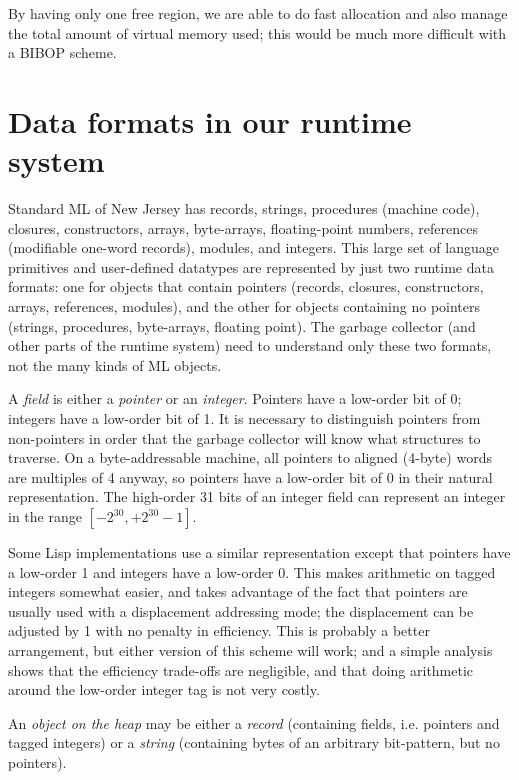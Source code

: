 By having only one free region, we are
able to do fast allocation
and also manage the total amount of virtual
memory used\cite{appel89:sggc}; this would be much more difficult
with a BIBOP scheme.

\section{Data formats in our runtime system}
\label{data}
Standard ML of New Jersey has
records, strings, procedures (machine code),
closures, constructors, arrays, byte-arrays, floating-point
numbers, references (modifiable one-word records),
modules, and integers.  This large set of language primitives and
user-defined datatypes are represented
by just two runtime data formats: one for objects that contain pointers
(records, closures, constructors, arrays, references, modules), and
the other for objects containing no pointers (strings, procedures,
byte-arrays, floating point).  The garbage collector (and other
parts of the runtime system) need to understand only these two formats,
not the many kinds of ML objects.

A {\em field} is either a 
{\em pointer} or an {\em integer}.  Pointers
have a low-order bit of 0; integers have a low-order bit of 1.
It is necessary to distinguish pointers from non-pointers in order that
the garbage collector
will know what structures to traverse.
On a byte-addressable machine, all pointers to aligned (4-byte) words
are multiples of 4 anyway, so pointers have a low-order bit of 0 in
their natural representation.  The high-order 31 bits of an integer
field can represent an integer in the range $[-2^{30}, +2^{30}-1]$.

Some Lisp implementations use a similar representation except that
pointers have a low-order 1 and integers have a low-order 0. This makes
arithmetic on tagged integers somewhat easier, and takes advantage
of the fact that pointers are usually used with a displacement addressing mode;
the displacement can be adjusted by 1 with no penalty in efficiency.
This is probably a better arrangement, but 
either version of this scheme will work; and a simple analysis\cite{appel89:tag}
shows that the efficiency trade-offs are negligible, and that 
doing arithmetic around the low-order integer tag is not very costly.

An {\em object on the heap} may be either a {\em record}
(containing fields,
i.e. pointers and tagged integers) or
a {\em string}
(containing bytes of an arbitrary bit-pattern, but no pointers).

